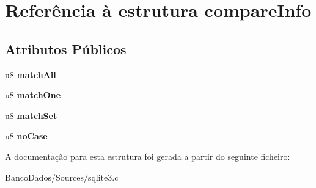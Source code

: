 \hypertarget{structcompare_info}{\section{Referência à estrutura compare\-Info}
\label{structcompare_info}
}
\subsection*{Atributos Públicos}
\begin{DoxyCompactItemize}
\item 
\hypertarget{structcompare_info_a1161e850029ef556e6daee856d32b2e2}{u8 {\bfseries match\-All}}\label{structcompare_info_a1161e850029ef556e6daee856d32b2e2}

\item 
\hypertarget{structcompare_info_ab9aabbf6d3df26bad786b532330a2fd7}{u8 {\bfseries match\-One}}\label{structcompare_info_ab9aabbf6d3df26bad786b532330a2fd7}

\item 
\hypertarget{structcompare_info_a5d2ff58a72c9eb7d22f18915c1751655}{u8 {\bfseries match\-Set}}\label{structcompare_info_a5d2ff58a72c9eb7d22f18915c1751655}

\item 
\hypertarget{structcompare_info_a6de76861b066547321f7a255cb7042ab}{u8 {\bfseries no\-Case}}\label{structcompare_info_a6de76861b066547321f7a255cb7042ab}

\end{DoxyCompactItemize}


A documentação para esta estrutura foi gerada a partir do seguinte ficheiro\-:\begin{DoxyCompactItemize}
\item 
Banco\-Dados/\-Sources/sqlite3.\-c\end{DoxyCompactItemize}
